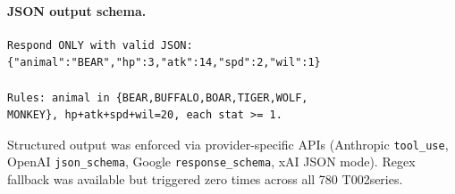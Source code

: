 \documentclass[11pt]{article}
\newcommand{\tTwo}{T002}
\begin{document}
\paragraph{JSON output schema.}
\begingroup
\small
\begin{verbatim}
Respond ONLY with valid JSON:
{"animal":"BEAR","hp":3,"atk":14,"spd":2,"wil":1}

Rules: animal in {BEAR,BUFFALO,BOAR,TIGER,WOLF,
MONKEY}, hp+atk+spd+wil=20, each stat >= 1.
\end{verbatim}
\endgroup

\noindent Structured output was enforced via provider-specific APIs (Anthropic \texttt{tool\_use}, OpenAI \texttt{json\_schema}, Google \texttt{response\_schema}, xAI JSON mode).
Regex fallback was available but triggered zero times across all 780 \tTwo series.
\end{document}
